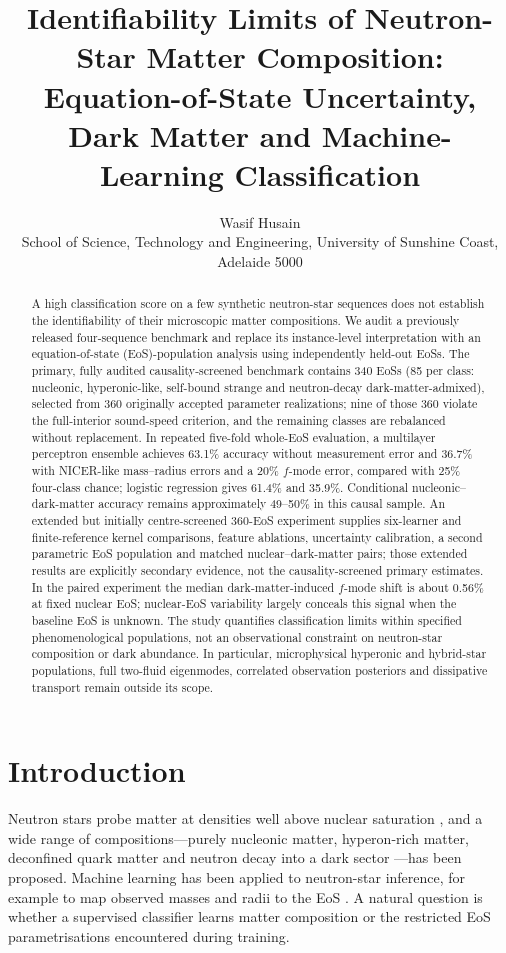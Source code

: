 \documentclass[11pt,a4paper]{article}
\title{Identifiability Limits of Neutron-Star Matter Composition:\\[2pt]
\large Equation-of-State Uncertainty, Dark Matter and Machine-Learning Classification}
\author{Wasif Husain\\ \small School of Science, Technology and Engineering, University of Sunshine Coast, Adelaide 5000}
\date{}
\begin{document}
\maketitle

\begin{abstract}
A high classification score on a few synthetic neutron-star sequences does not establish the identifiability of their microscopic matter compositions. We audit a previously released four-sequence benchmark and replace its instance-level interpretation with an equation-of-state (EoS)-population analysis using independently held-out EoSs. The primary, fully audited causality-screened benchmark contains 340 EoSs (85 per class: nucleonic, hyperonic-like, self-bound strange and neutron-decay dark-matter-admixed), selected from 360 originally accepted parameter realizations; nine of those 360 violate the full-interior sound-speed criterion, and the remaining classes are rebalanced without replacement. In repeated five-fold whole-EoS evaluation, a multilayer perceptron ensemble achieves 63.1\% accuracy without measurement error and 36.7\% with NICER-like mass--radius errors and a 20\% $f$-mode error, compared with 25\% four-class chance; logistic regression gives 61.4\% and 35.9\%. Conditional nucleonic--dark-matter accuracy remains approximately 49--50\% in this causal sample. An extended but initially centre-screened 360-EoS experiment supplies six-learner and finite-reference kernel comparisons, feature ablations, uncertainty calibration, a second parametric EoS population and matched nuclear--dark-matter pairs; those extended results are explicitly secondary evidence, not the causality-screened primary estimates. In the paired experiment the median dark-matter-induced $f$-mode shift is about 0.56\% at fixed nuclear EoS; nuclear-EoS variability largely conceals this signal when the baseline EoS is unknown. The study quantifies classification limits within specified phenomenological populations, not an observational constraint on neutron-star composition or dark abundance. In particular, microphysical hyperonic and hybrid-star populations, full two-fluid eigenmodes, correlated observation posteriors and dissipative transport remain outside its scope.
\end{abstract}

\section{Introduction}
Neutron stars probe matter at densities well above nuclear saturation \citep{LP04,OF16}, and a wide range of compositions---purely nucleonic matter, hyperon-rich matter, deconfined quark matter and neutron decay into a dark sector \citep{Husain22}---has been proposed.
Machine learning has been applied to neutron-star inference, for example to map observed masses and radii to the EoS \citep{Fujimoto18}. A natural question is whether a supervised classifier learns matter composition or the restricted EoS parametrisations encountered during training.
\end{document}
